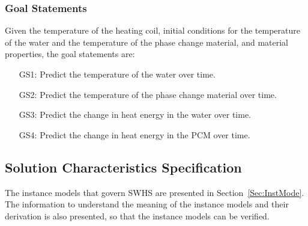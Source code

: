\documentclass[12pt]{article}
\begin{document}
\subsubsection{Goal Statements}
\label{Sec:GoalStat}
Given the temperature of the heating coil, initial conditions for the temperature of the water and the temperature of the phase change material, and material properties, the goal statements are:
\begin{itemize}
\item[GS1:]Predict the temperature of the water over time.
\item[GS2:]Predict the temperature of the phase change material over time.
\item[GS3:]Predict the change in heat energy in the water over time.
\item[GS4:]Predict the change in heat energy in the PCM over time.
\end{itemize}
\subsection{Solution Characteristics Specification}
\label{Sec:SoluCharSpec}
The instance models that govern SWHS are presented in Section~\ref{Sec:InstMode}. The information to understand the meaning of the instance models and their derivation is also presented, so that the instance models can be verified.
\end{document}
